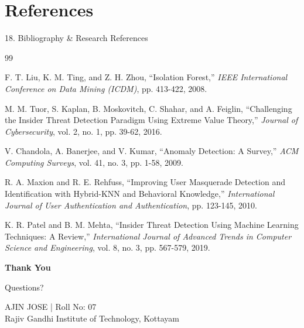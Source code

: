 \documentclass[aspectratio=169]{beamer}
\begin{document}
\section{References}

\begin{frame}{18. Bibliography \& Research References}

\begin{thebibliography}{99}

F. T. Liu, K. M. Ting, and Z. H. Zhou, 
``Isolation Forest,'' 
\textit{IEEE International Conference on Data Mining (ICDM)}, 
pp. 413-422, 2008.

M. M. Tuor, S. Kaplan, B. Moskovitch, C. Shahar, and A. Feiglin,
``Challenging the Insider Threat Detection Paradigm Using Extreme Value Theory,''
\textit{Journal of Cybersecurity}, 
vol. 2, no. 1, pp. 39-62, 2016.

V. Chandola, A. Banerjee, and V. Kumar,
``Anomaly Detection: A Survey,''
\textit{ACM Computing Surveys}, 
vol. 41, no. 3, pp. 1-58, 2009.

R. A. Maxion and R. E. Rehfuss,
``Improving User Masquerade Detection and Identification with Hybrid-KNN and Behavioral Knowledge,''
\textit{International Journal of User Authentication and Authentication}, 
pp. 123-145, 2010.

K. R. Patel and B. M. Mehta,
``Insider Threat Detection Using Machine Learning Techniques: A Review,''
\textit{International Journal of Advanced Trends in Computer Science and Engineering}, 
vol. 8, no. 3, pp. 567-579, 2019.

\end{thebibliography}

\end{frame}


\begin{frame}[plain]
\centering
\vspace{3cm}
{\Huge \textbf{Thank You}}

\vspace{1.5cm}

{\Large Questions?}

\vspace{1cm}

{\small AJIN JOSE | Roll No: 07 \\ Rajiv Gandhi Institute of Technology, Kottayam}
\end{frame}
\end{document}
